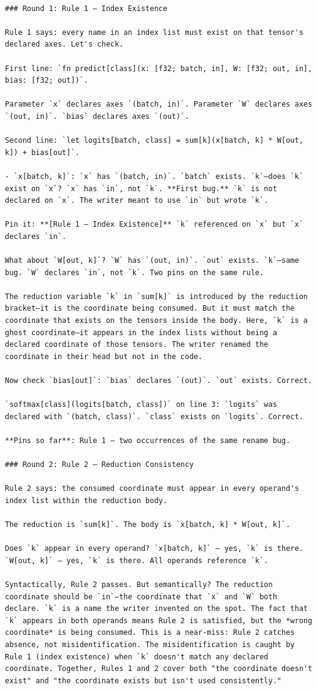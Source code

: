 \documentclass[11pt,titlepage]{article}
\begin{document}
\begin{verbatim}

### Round 1: Rule 1 — Index Existence

Rule 1 says: every name in an index list must exist on that tensor's declared axes. Let's check.

First line: `fn predict[class](x: [f32; batch, in], W: [f32; out, in], bias: [f32; out])`.

Parameter `x` declares axes `(batch, in)`. Parameter `W` declares axes `(out, in)`. `bias` declares axes `(out)`.

Second line: `let logits[batch, class] = sum[k](x[batch, k] * W[out, k]) + bias[out]`.

- `x[batch, k]`: `x` has `(batch, in)`. `batch` exists. `k`—does `k` exist on `x`? `x` has `in`, not `k`. **First bug.** `k` is not declared on `x`. The writer meant to use `in` but wrote `k`.

Pin it: **[Rule 1 — Index Existence]** `k` referenced on `x` but `x` declares `in`.

What about `W[out, k]`? `W` has `(out, in)`. `out` exists. `k`—same bug. `W` declares `in`, not `k`. Two pins on the same rule.

The reduction variable `k` in `sum[k]` is introduced by the reduction bracket—it is the coordinate being consumed. But it must match the coordinate that exists on the tensors inside the body. Here, `k` is a ghost coordinate—it appears in the index lists without being a declared coordinate of those tensors. The writer renamed the coordinate in their head but not in the code.

Now check `bias[out]`: `bias` declares `(out)`. `out` exists. Correct.

`softmax[class](logits[batch, class])` on line 3: `logits` was declared with `(batch, class)`. `class` exists on `logits`. Correct.

**Pins so far**: Rule 1 — two occurrences of the same rename bug.

### Round 2: Rule 2 — Reduction Consistency

Rule 2 says: the consumed coordinate must appear in every operand's index list within the reduction body.

The reduction is `sum[k]`. The body is `x[batch, k] * W[out, k]`.

Does `k` appear in every operand? `x[batch, k]` — yes, `k` is there. `W[out, k]` — yes, `k` is there. All operands reference `k`.

Syntactically, Rule 2 passes. But semantically? The reduction coordinate should be `in`—the coordinate that `x` and `W` both declare. `k` is a name the writer invented on the spot. The fact that `k` appears in both operands means Rule 2 is satisfied, but the *wrong coordinate* is being consumed. This is a near-miss: Rule 2 catches absence, not misidentification. The misidentification is caught by Rule 1 (index existence) when `k` doesn't match any declared coordinate. Together, Rules 1 and 2 cover both "the coordinate doesn't exist" and "the coordinate exists but isn't used consistently."


\end{verbatim}
\end{document}
